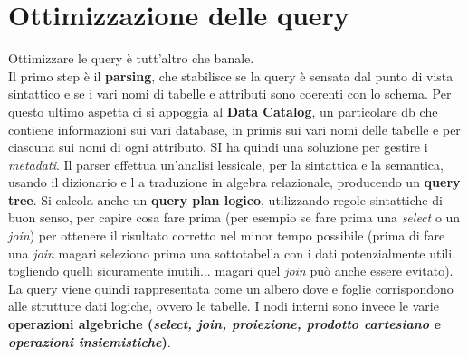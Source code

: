 \documentclass[a4paper,12pt, oneside]{book}
\begin{document}
\section{Ottimizzazione delle query}
Ottimizzare le query è tutt'altro che banale.\\
Il primo step è il \textbf{parsing}, che stabilisce se la query è sensata dal
punto di vista sintattico e se i vari nomi di tabelle e attributi sono coerenti
con lo schema. Per questo ultimo aspetta ci si appoggia al \textbf{Data
  Catalog}, un particolare db che contiene informazioni sui vari database, in
primis sui vari nomi delle tabelle e per ciascuna sui nomi di ogni attributo. SI
ha quindi una soluzione per gestire i \textit{metadati}. Il parser effettua
un'analisi lessicale, per la sintattica e la semantica, usando il dizionario e
l a traduzione in algebra relazionale, producendo un \textbf{query tree}. Si
calcola anche un \textbf{query plan logico}, utilizzando regole sintattiche di
buon senso, per capire cosa fare prima (per esempio se fare prima una
\textit{select} o un \textit{join}) per ottenere il risultato corretto nel minor
tempo possibile (prima di fare una \textit{join} magari seleziono prima una
sottotabella con i dati potenzialmente utili, togliendo quelli sicuramente
inutili$\ldots$ magari quel \textit{join} può anche essere evitato). La query
viene quindi rappresentata come un albero dove e foglie corrispondono alle
strutture dati logiche, ovvero le tabelle. I nodi interni sono invece le varie
\textbf{operazioni algebriche (\textit{select, join, proiezione, prodotto
    cartesiano} e \textit{operazioni insiemistiche})}.
\newpage
\end{document}
